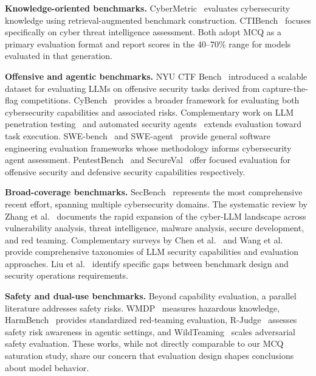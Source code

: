 \documentclass[final]{elsarticle}
\begin{document}
\textbf{Knowledge-oriented benchmarks.} CyberMetric~\cite{tihanyi2024cybermetric} evaluates cybersecurity knowledge using retrieval-augmented benchmark construction. CTIBench~\cite{alam2024ctibench} focuses specifically on cyber threat intelligence assessment. Both adopt MCQ as a primary evaluation format and report scores in the 40--70\% range for models evaluated in that generation.

\textbf{Offensive and agentic benchmarks.} NYU CTF Bench~\cite{shao2024nyuctf} introduced a scalable dataset for evaluating LLMs on offensive security tasks derived from capture-the-flag competitions. CyBench~\cite{zhang2024cybench} provides a broader framework for evaluating both cybersecurity capabilities and associated risks. Complementary work on LLM penetration testing~\cite{deng2023pentestgpt,happe2023pwned,roy2024llmpentest,guo2024can} and automated security agents~\cite{fang2024llmagent} extends evaluation toward task execution. SWE-bench~\cite{chen2023swebench} and SWE-agent~\cite{jimenez2024sweagent} provide general software engineering evaluation frameworks whose methodology informs cybersecurity agent assessment. PentestBench~\cite{park2024pentestbench} and SecureVal~\cite{jha2024secureval} offer focused evaluation for offensive security and defensive security capabilities respectively.

\textbf{Broad-coverage benchmarks.} SecBench~\cite{jing2024secbench} represents the most comprehensive recent effort, spanning multiple cybersecurity domains. The systematic review by Zhang et al.~\cite{zhang2024llmcyber} documents the rapid expansion of the cyber-LLM landscape across vulnerability analysis, threat intelligence, malware analysis, secure development, and red teaming. Complementary surveys by Chen et al.~\cite{chen2024cyberllm} and Wang et al.~\cite{wang2024securityeval} provide comprehensive taxonomies of LLM security capabilities and evaluation approaches. Liu et al.~\cite{liu2024benchmarking} identify specific gaps between benchmark design and security operations requirements.

\textbf{Safety and dual-use benchmarks.} Beyond capability evaluation, a parallel literature addresses safety risks. WMDP~\cite{li2024wmdp} measures hazardous knowledge, HarmBench~\cite{mazeika2024harmbench} provides standardized red-teaming evaluation, R-Judge~\cite{yuan2024rjudge} assesses safety risk awareness in agentic settings, and WildTeaming~\cite{jiang2024wildteaming} scales adversarial safety evaluation. These works, while not directly comparable to our MCQ saturation study, share our concern that evaluation design shapes conclusions about model behavior.
\end{document}
